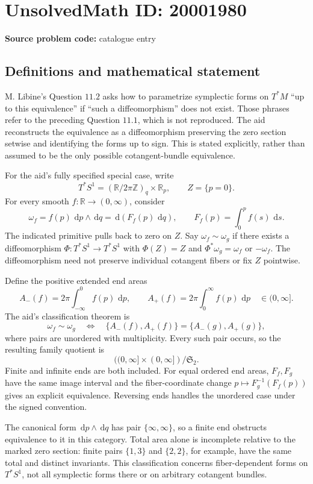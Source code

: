 \documentclass[11pt]{article}
\newcommand{\Z}{\mathbb{Z}}
\newcommand{\R}{\mathbb{R}}
\newcommand{\dd}{\,\mathrm{d}}
\begin{document}
\section*{UnsolvedMath ID: 20001980}
\textbf{Source problem code:} catalogue entry
\subsection{Definitions and mathematical statement}
M. Libine's Question \(11.2\) asks how to parametrize symplectic forms on \(T^*M\) ``up to this equivalence'' if ``such a diffeomorphism'' does not exist. Those phrases refer to the preceding Question \(11.1\), which is not reproduced. The aid reconstructs the equivalence as a diffeomorphism preserving the zero section setwise and identifying the forms up to sign. This is stated explicitly, rather than assumed to be the only possible cotangent-bundle equivalence.

For the aid's fully specified special case, write
\[
 T^*S^1=(\R/2\pi\Z)_q\times\R_p,\qquad Z=\{p=0\}.
\]
For every smooth \(f:\R\to(0,\infty)\), consider
\[
 \omega_f=f(p)\,\dd p\wedge\dd q
      =\dd(F_f(p)\,\dd q),\qquad F_f(p)=\int_0^p f(s)\,\dd s.
\]
The indicated primitive pulls back to zero on \(Z\). Say \(\omega_f\sim\omega_g\) if there exists a diffeomorphism \(\Phi:T^*S^1\to T^*S^1\) with \(\Phi(Z)=Z\) and \(\Phi^*\omega_g=\omega_f\) or \(-\omega_f\). The diffeomorphism need not preserve individual cotangent fibers or fix \(Z\) pointwise.

Define the positive extended end areas
\[
 A_-(f)=2\pi\int_{-\infty}^0f(p)\,\dd p,\qquad
 A_+(f)=2\pi\int_0^\infty f(p)\,\dd p
       \quad\in(0,\infty].
\]
The aid's classification theorem is
\[
 \omega_f\sim\omega_g
 \quad\Longleftrightarrow\quad
 \{A_-(f),A_+(f)\}=\{A_-(g),A_+(g)\},
\]
where pairs are unordered with multiplicity. Every such pair occurs, so the resulting family quotient is
\[
 ((0,\infty]\times(0,\infty])/\mathfrak S_2.
\]
Finite and infinite ends are both included. For equal ordered end areas, \(F_f,F_g\) have the same image interval and the fiber-coordinate change \(p\mapsto F_g^{-1}(F_f(p))\) gives an explicit equivalence. Reversing ends handles the unordered case under the signed convention.

The canonical form \(\dd p\wedge\dd q\) has pair \(\{\infty,\infty\}\), so a finite end obstructs equivalence to it in this category. Total area alone is incomplete relative to the marked zero section: finite pairs \(\{1,3\}\) and \(\{2,2\}\), for example, have the same total and distinct invariants. This classification concerns fiber-dependent forms on \(T^*S^1\), not all symplectic forms there or on arbitrary cotangent bundles.
\end{document}
